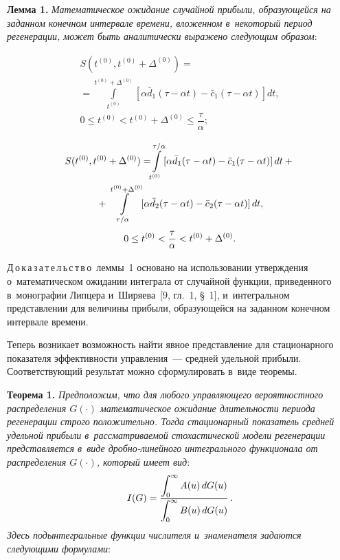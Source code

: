 \begin{multicols}{2}
\smallskip

\noindent
\textbf{Лемма 1.} \textit{Математическое ожидание случайной прибыли, образующейся 
на заданном конечном интервале времени, вложенном в~некоторый период 
регенерации, может быть аналитически выражено сле\-ду\-ющим образом}:

\vspace*{-6pt}

\noindent
\begin{multline*}
S(t^{(0)},t^{(0)}+\Delta^{(0)})={}\\
{}=\int\limits_{t^{(0)}}^{t^{(0)}+\Delta^{(0)}}
\left[\alpha\bar{d}_1(\tau-\alpha t)-\bar{c}_1(\tau-\alpha t)\right]dt,\\
0\leq t^{(0)}<t^{(0)}+\Delta^{(0)}\leq\dfrac{\tau}{\alpha};
\end{multline*}


\noindent
\begin{multline*}
    S(t^{(0)},t^{(0)}+\Delta^{(0)})=\!\!\int\limits_{t^{(0)}}^{\tau/\alpha}[\alpha\bar{d
}_1(\tau-\alpha t)-\bar{c}_1(\tau-\alpha t)]\, dt+ {}\\
{}+
\int\limits_{\tau/\alpha}^{t^{(0)}+\Delta^{(0)}}[\alpha\bar{d}_2(\tau-\alpha t)-
\bar{c}_2(\tau-\alpha t)]\,dt,\\
0\leq t^{(0)}<\displaystyle\frac{\displaystyle \tau\mathstrut}{\displaystyle \alpha\mathstrut}<t^{(0)}+\Delta^{(0)}.
\end{multline*}

\vspace*{-6pt}

\noindent
Д\,о\,к\,а\,з\,а\,т\,е\,л\,ь\,с\,т\,в\,о\ леммы~1 основано на использовании утверждения о~математическом 
ожидании интеграла от случайной функции, приведенного в~монографии Липцера и~Ширяева~[9, гл.~1, \S~1], и~интегральном представлении для 
величины прибыли, образующейся на заданном конечном интервале времени.

Теперь возникает возможность найти явное представление для стационарного 
показателя эффективности управления~--- средней удельной прибыли. Соответствующий 
результат можно сформулировать в~виде тео\-ремы.

\smallskip

\noindent
\textbf{Теорема 1.} \textit{Предположим, что для любого управ\-ля\-юще\-го 
вероятностного распределения $G(\cdot )$ математическое ожидание длительности 
периода регенерации строго положительно. Тогда стационарный показатель средней 
удельной прибыли в~рас\-смат\-ри\-ва\-емой сто\-ха\-сти\-че\-ской модели регенерации 
пред\-став\-ля\-ет\-ся в~виде дроб\-но-ли\-ней\-но\-го интегрального функционала от 
распределения $G(\cdot)$, который имеет вид}:
\begin{equation}
    I(G)=\displaystyle\frac{\displaystyle \int\nolimits_0^\infty A(u)\, dG(u)\mathstrut}{\displaystyle \int\nolimits_0^\infty 
B(u)\, dG(u)\mathstrut}\,. \label{e11-sh}
\end{equation}
\textit{Здесь подынтегральные функции числителя и~знаменателя задаются следующими 
формулами}:


\end{multicols}
